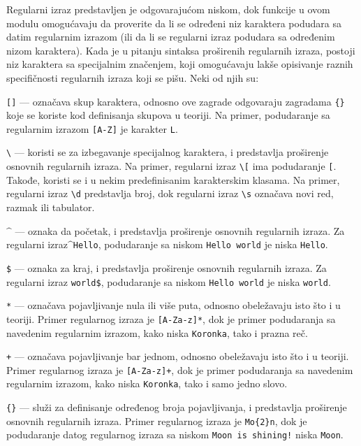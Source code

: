 \documentclass[12pt,oneside]{memoir}
\theoremstyle{plain}
\theoremstyle{definition}
\begin{document}
Regularni izraz predstavljen je odgovarajućom niskom, dok funkcije u ovom modulu omogućavaju da proverite da li se određeni niz karaktera podudara sa datim regularnim izrazom (ili da li se regularni izraz podudara sa određenim nizom karaktera).
Kada je u pitanju sintaksa proširenih regularnih izraza, postoji niz karaktera sa specijalnim značenjem, koji omogućavaju lakše opisivanje raznih specifičnosti regularnih izraza koji se pišu. Neki od njih su:
\begin{description}
	\item \texttt{[]} --- označava skup karaktera, odnosno ove zagrade odgovaraju zagradama \texttt{\{\}} koje se koriste kod definisanja skupova u teoriji. Na primer, podudaranje sa regularnim izrazom \texttt{[A-Z]} je karakter \texttt{L}.
	\item \texttt{\textbackslash} --- koristi se za izbegavanje specijalnog karaktera, i predstavlja proširenje osnovnih regularnih izraza. Na primer, regularni izraz \texttt{\textbackslash[} ima podudaranje \texttt{[}. Takođe, koristi se i u nekim predefinisanim karakterskim klasama. Na primer, regularni izraz \texttt{\textbackslash d}  predstavlja broj, dok regularni izraz \texttt{\textbackslash s} označava novi red, razmak ili tabulator.
	\item \texttt{$\^$} --- oznaka da početak, i predstavlja proširenje osnovnih regularnih izraza. Za regularni izraz\quad \texttt{$\^$Hello}, podudaranje sa niskom \texttt{Hello world} je niska \texttt{Hello}.
	\item \texttt{\$} --- oznaka za kraj, i predstavlja proširenje osnovnih regularnih izraza. Za regularni izraz \texttt{world\$}, podudaranje sa niskom \texttt{Hello world} je niska \texttt{world}.
	\item \texttt{*} --- označava pojavljivanje nula ili više puta, odnosno obeležavaju isto što i u teoriji. Primer regularnog izraza je \texttt{[A-Za-z]*}, dok je primer podudaranja sa navedenim regularnim izrazom, kako niska \texttt{Koronka}, tako i prazna reč.
	\item \texttt{+} --- označava pojavljivanje bar jednom,  odnosno obeležavaju isto što i u teoriji. Primer regularnog izraza je \texttt{[A-Za-z]+}, dok je primer podudaranja sa navedenim regularnim izrazom, kako niska \texttt{Koronka}, tako i samo jedno slovo.
	\item \texttt{\{\}} --- služi za definisanje određenog broja pojavljivanja, i predstavlja proširenje osnovnih regularnih izraza.  Primer regularnog izraza je \texttt{Mo\{2\}n}, dok je podudaranje datog regularnog izraza sa niskom \texttt{Moon is shining!} niska \texttt{Moon}.

\end{description}
\end{document}
